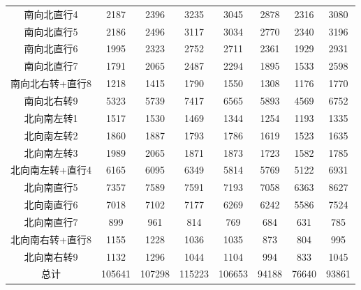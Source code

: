 \documentclass[UTF8]{article}
\begin{document}
\begin{table}[h]
\begin{tabular}{cccccccc}
            南向北直行4	&2187	&2396	&3235	&3045	&2878	&2316	&3080\\
           
            南向北直行5	&2186	&2496	&3117	&3034	&2770	&2340	&3196\\
           
            南向北直行6	&1995	&2323	&2752	&2711	&2361	&1929	&2931\\
           
            南向北直行7	&1791	&2065	&2487	&2294	&1895	&1533	&2598\\
           
            南向北右转+直行8	&1218	&1415	&1790	&1550	&1308	&1176	&1770\\
                       
            南向北右转9	&5323	&5739	&7417	&6565	&5893	&4569	&6752\\
           
            北向南左转1	&1517	&1530	&1469	&1344	&1254	&1193	&1335\\
           
            北向南左转2	&1860	&1887	&1793	&1786	&1619	&1523	&1635\\
           
            北向南左转3	&1989	&2065	&1871	&1873	&1723	&1582	&1785\\
           
            北向南左转+直行4	&6165	&6095	&6349	&5814	&5769	&5122	&6931\\
           
            北向南直行5	&7357	&7589	&7591	&7193	&7058	&6363	&8627\\
           
            北向南直行6	&7018	&7102	&7177	&6269	&6242	&5586	&7524\\
           
            北向南直行7	&899	&961	&814	&769	&684	&631	&785\\
           
            北向南右转+直行8	&1155	&1228	&1036	&1035	&873	&804	&995\\
           
            北向南右转9	&1132	&1296	&1044	&1104	&994	&833	&1045\\
           
            总计	&105641	&107298	&115223	&106653	&94188	&76640	&93861\\
           \hline
            
        \end{tabular}
    \end{table}\\
\end{document}
